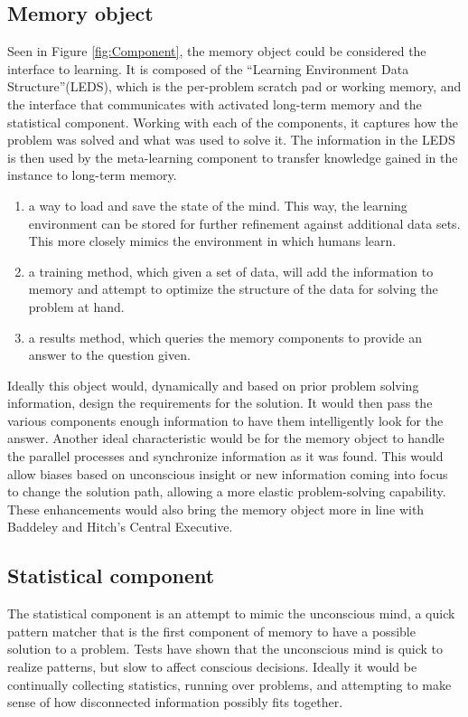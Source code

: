 \subsection{Memory object} 

Seen in Figure \ref{fig:Component}, the memory object could be considered the interface to learning. It is composed of the 
``Learning Environment Data Structure''(LEDS), which is the per-problem scratch pad or working memory, 
and the interface that communicates with activated long-term memory and the statistical component. 
Working with each of the components, it captures how the problem was solved and what was used to solve it.  
The information in the LEDS is then used by the meta-learning component to transfer knowledge gained 
in the instance to long-term memory.

\begin{enumerate}     
	\item a way to load and save the state of the mind. This way, the learning
	environment can be stored for further refinement against 
	additional data sets. This more closely mimics the environment in which 
	humans learn.
	\item a training method, which given a set of data, will add the
	information to memory and attempt to optimize the structure of the data 
	for solving the problem at hand.
	\item a results method, which queries the memory components to provide an answer
	to the question given.
\end{enumerate}

Ideally this object would, dynamically
and based on prior problem solving information, design the requirements for the
solution. It would then pass the various components enough information to have
them intelligently look for the answer.  Another ideal characteristic would be
for the memory object to handle the parallel processes and synchronize
information as it was found.  This would allow biases based on unconscious
insight or new information coming into focus to change the solution path,
allowing a more elastic problem-solving capability.  These enhancements would
also bring the memory object more in line with Baddeley and Hitch's Central Executive.

\subsection{Statistical component} 

The statistical component is an attempt to
mimic the unconscious mind, a quick pattern matcher that is the first
component of memory to have a possible solution to a problem.  Tests have shown
\cite{BLINK} that the unconscious mind is quick to realize patterns, but slow to
affect conscious decisions. Ideally it would be continually collecting
statistics, running over problems, and attempting to make sense of how
disconnected information possibly fits together.

